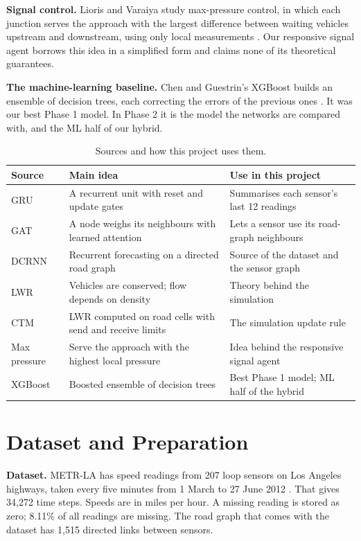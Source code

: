 \documentclass[conference]{IEEEtran}
\begin{document}
\textbf{Signal control.} Lioris and Varaiya study max-pressure control, in which each junction serves the approach with the largest difference between waiting vehicles upstream and downstream, using only local measurements \cite{lioris}. Our responsive signal agent borrows this idea in a simplified form and claims none of its theoretical guarantees.

\textbf{The machine-learning baseline.} Chen and Guestrin's XGBoost builds an ensemble of decision trees, each correcting the errors of the previous ones \cite{xgb}. It was our best Phase 1 model. In Phase 2 it is the model the networks are compared with, and the ML half of our hybrid.

\begin{table}[t]\centering\small
\caption{Sources and how this project uses them.}\label{tab:lit}
\begin{tabular}{@{}p{}p{}p{}@{}}\toprule
Source & Main idea & Use in this project\\\midrule
GRU \cite{cho} & A recurrent unit with reset and update gates & Summarises each sensor's last 12 readings\\
GAT \cite{gat} & A node weighs its neighbours with learned attention & Lets a sensor use its road-graph neighbours\\
DCRNN \cite{dcrnn} & Recurrent forecasting on a directed road graph & Source of the dataset and the sensor graph\\
LWR \cite{lw,richards} & Vehicles are conserved; flow depends on density & Theory behind the simulation\\
CTM \cite{ctm,ctmoverview} & LWR computed on road cells with send and receive limits & The simulation update rule\\
Max pressure \cite{lioris} & Serve the approach with the highest local pressure & Idea behind the responsive signal agent\\
XGBoost \cite{xgb} & Boosted ensemble of decision trees & Best Phase 1 model; ML half of the hybrid\\
\bottomrule\end{tabular}
\end{table}

\section{Dataset and Preparation}
\textbf{Dataset.} METR-LA has speed readings from 207 loop sensors on Los Angeles highways, taken every five minutes from 1 March to 27 June 2012 \cite{dcrnn}. That gives 34,272 time steps. Speeds are in miles per hour. A missing reading is stored as zero; 8.11\% of all readings are missing. The road graph that comes with the dataset has 1,515 directed links between sensors.
\end{document}

